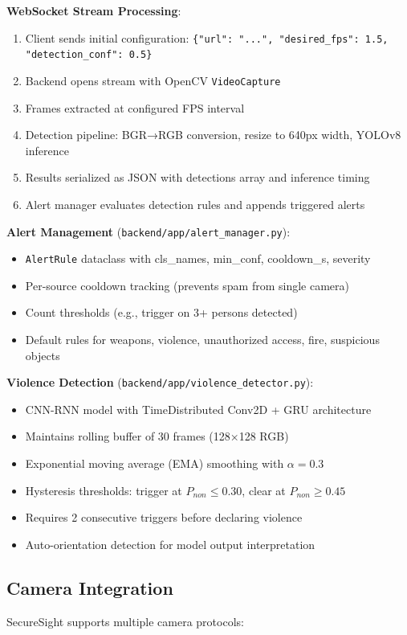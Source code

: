 \documentclass[conference]{IEEEtran}
\begin{document}
\textbf{WebSocket Stream Processing}:
\begin{enumerate}
    \item Client sends initial configuration: \texttt{\{"url": "...", "desired\_fps": 1.5, "detection\_conf": 0.5\}}
    \item Backend opens stream with OpenCV \texttt{VideoCapture}
    \item Frames extracted at configured FPS interval
    \item Detection pipeline: BGR→RGB conversion, resize to 640px width, YOLOv8 inference
    \item Results serialized as JSON with detections array and inference timing
    \item Alert manager evaluates detection rules and appends triggered alerts
\end{enumerate}

\textbf{Alert Management} (\texttt{backend/app/alert\_manager.py}):
\begin{itemize}
    \item \texttt{AlertRule} dataclass with cls\_names, min\_conf, cooldown\_s, severity
    \item Per-source cooldown tracking (prevents spam from single camera)
    \item Count thresholds (e.g., trigger on 3+ persons detected)
    \item Default rules for weapons, violence, unauthorized access, fire, suspicious objects
\end{itemize}

\textbf{Violence Detection} (\texttt{backend/app/violence\_detector.py}):
\begin{itemize}
    \item CNN-RNN model with TimeDistributed Conv2D + GRU architecture
    \item Maintains rolling buffer of 30 frames (128×128 RGB)
    \item Exponential moving average (EMA) smoothing with $\alpha = 0.3$
    \item Hysteresis thresholds: trigger at $P_{non} \leq 0.30$, clear at $P_{non} \geq 0.45$
    \item Requires 2 consecutive triggers before declaring violence
    \item Auto-orientation detection for model output interpretation
\end{itemize}

\subsection{Camera Integration}
SecureSight supports multiple camera protocols:
\end{document}
